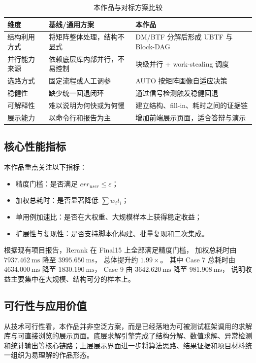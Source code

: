 \documentclass[12pt,a4paper,fontset=none]{ctexart}
\begin{document}
\begin{table}[H]
\centering
\caption{本作品与对标方案比较}
\label{tab:competitor}
\begin{tabular}{p{3.2cm}p{5.1cm}p{5.5cm}}
\toprule
维度 & 基线/通用方案 & 本作品 \\
\midrule
结构利用方式 & 将矩阵整体处理，结构不显式 & DM/BTF 分解后形成 UBTF 与 Block-DAG \\
并行能力来源 & 依赖底层库内部并行，不易控制 & 块级并行 + work-stealing 调度 \\
选路方式 & 固定流程或人工调参 & AUTO 按矩阵画像自适应决策 \\
稳健性 & 缺少统一回退闭环 & 通过信号检测触发稳健回退 \\
可解释性 & 难以说明为何快或为何慢 & 建立结构、fill-in、耗时之间的证据链 \\
展示能力 & 以命令行和报告为主 & 增加前端展示页面，适合答辩与演示 \\
\bottomrule
\end{tabular}
\end{table}

\subsection{核心性能指标}

本作品重点关注以下指标：
\begin{itemize}
  \item 精度门槛：是否满足 $err_{user}\le\varepsilon$；
  \item 加权总耗时：是否显著降低 $\sum w_i t_i$；
  \item 单用例加速比：是否在大权重、大规模样本上获得稳定收益；
  \item 扩展性与复现性：是否支持脚本化构建、批量复现和二次集成。
\end{itemize}

根据现有项目报告，Rerank 在 Final15 上全部满足精度门槛，
加权总耗时由 $7937.462\ \mathrm{ms}$ 降至 $3995.650\ \mathrm{ms}$，
总体提升约 $1.99\times$。
其中 Case 7 总耗时由 $4634.000\ \mathrm{ms}$ 降至 $1830.190\ \mathrm{ms}$，
Case 9 由 $3642.620\ \mathrm{ms}$ 降至 $981.908\ \mathrm{ms}$，
说明收益主要集中在大规模、结构可分的样本上。

\subsection{可行性与应用价值}

从技术可行性看，本作品并非空泛方案，而是已经落地为可被测试框架调用的求解库与可直接浏览的展示页面。底层求解引擎完成了结构分解、数值求解、异常检测和统计输出等核心链路；上层展示界面进一步将算法思路、结果证据和项目材料统一组织为易理解的作品形态。
\end{document}
